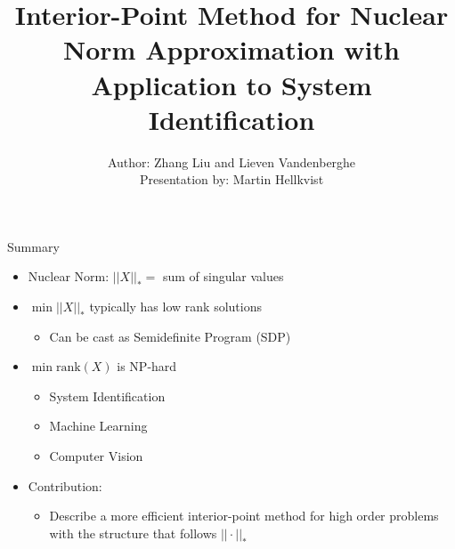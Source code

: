 \documentclass{beamer}
\title{Interior-Point Method for Nuclear Norm Approximation with Application to System Identification}
\author{Author: Zhang Liu and Lieven Vandenberghe \\ \footnotesize Presentation by: Martin Hellkvist}
\begin{document}
\begin{frame}[plain]
    \maketitle
\end{frame}
\begin{frame}{Summary}
	\begin{itemize}
		\item Nuclear Norm: $ ||X||_* =$ sum of singular values
		\item $ \min ||X||_* $ typically has low rank solutions
		\begin{itemize}
			\item Can be cast as Semidefinite Program (SDP)
		\end{itemize}
		\item $ \min \text{rank}(X) $ is NP-hard
		\begin{itemize}
			\item System Identification
			\item Machine Learning
			\item Computer Vision
		\end{itemize}
		\item Contribution:
		\begin{itemize}
			\item Describe a more efficient interior-point method for high order problems with the structure that follows $ ||\cdot||_* $
		\end{itemize}
	\end{itemize}
\end{frame}
\end{document}
